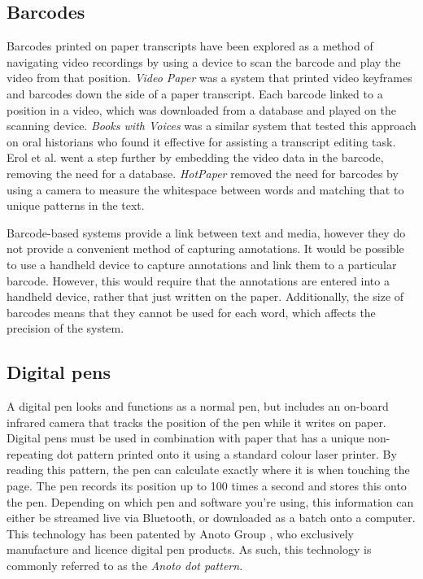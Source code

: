 \subsection{Barcodes}
Barcodes printed on paper transcripts have been explored as a method of navigating video recordings by using a device
to scan the barcode and play the video from that position. \textit{Video Paper} \citep{Hull2003} was a system that
printed video keyframes and barcodes down the side of a paper transcript. Each barcode linked to a position in a video,
which was downloaded from a database and played on the scanning device. \textit{Books with Voices} \citep{Klemmer2003}
was a similar system that tested this approach on oral historians who found it effective for assisting a transcript
editing task.  Erol et  al. \citep{Erol2007} went a step further by embedding the video data in the barcode, removing
the need for a database.  \textit{HotPaper} \citep{Erol2008} removed the need for barcodes by using a camera to measure
the whitespace between words and matching that to unique patterns in the text.

Barcode-based systems provide a link between text and media, however they do not provide a convenient method of
capturing annotations. It would be possible to use a handheld device to capture annotations and link them to a
particular barcode.  However, this would require that the annotations are entered into a handheld device, rather that
just written on the paper.  Additionally, the size of barcodes means that they cannot be used for each word, which
affects the precision of the system.

\subsection{Digital pens}

A digital pen looks and functions as a normal pen, but includes an on-board infrared camera that tracks the position of
the pen while it writes on paper. Digital pens must be used in combination with paper that has a unique non-repeating
dot pattern printed onto it using a standard colour laser printer.  By reading this pattern, the pen can calculate
exactly where it is when touching the page. The pen records its position up to 100 times a second and stores this onto
the pen. Depending on which pen and software you're using, this information can either be streamed live via Bluetooth,
or downloaded as a batch onto a computer. This technology has been patented by Anoto Group \citep{Fahraeus2003}, who
exclusively manufacture and licence digital pen products. As such, this technology is commonly referred to as the
\textit{Anoto dot pattern}.

